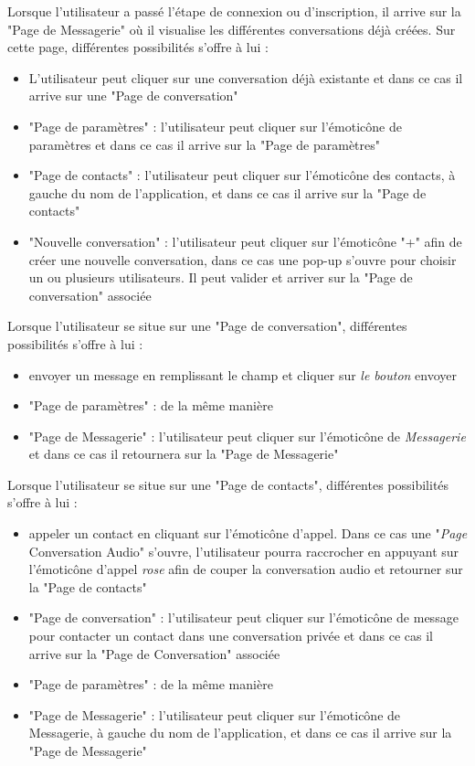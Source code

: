 	Lorsque l'utilisateur a passé l'étape de connexion ou d'inscription, il arrive sur la "Page de Messagerie" où il visualise les différentes conversations déjà créées. Sur cette page, différentes possibilités s'offre à lui :
	\begin{itemize}
		\item L'utilisateur peut cliquer sur une conversation déjà existante et dans ce cas il arrive sur une "Page de conversation"
		\item "Page de paramètres" : l'utilisateur peut cliquer sur l’émoticône de paramètres et dans ce cas il arrive sur la "Page de paramètres"
		\item "Page de contacts" : l'utilisateur peut cliquer sur l’émoticône des contacts, à gauche du nom de l'application, et dans ce cas il arrive sur la "Page de contacts"
		\item "Nouvelle conversation" : l'utilisateur peut cliquer sur l’émoticône "+" afin de créer une nouvelle conversation, dans ce cas une pop-up s'ouvre pour choisir un ou plusieurs utilisateurs. Il peut valider et arriver sur la "Page de conversation" associée\\
	\end{itemize}

	Lorsque l'utilisateur se situe sur une "Page de conversation", différentes possibilités s'offre à lui :
	\begin{itemize}
		\item envoyer un message en remplissant le champ et cliquer sur \textit{le bouton} envoyer
		\item "Page de paramètres" : de la même manière
		\item "Page de Messagerie" : l'utilisateur peut cliquer sur l’émoticône de \textit{Messagerie} et dans ce cas il retournera sur la "Page de Messagerie"\\
	\end{itemize}

	\newpage

	Lorsque l'utilisateur se situe sur une "Page de contacts", différentes possibilités s'offre à lui :
	\begin{itemize}
		\item appeler un contact en cliquant sur l’émoticône d'appel.
		Dans ce cas une "\textit{Page} Conversation Audio" s'ouvre, l'utilisateur pourra raccrocher en appuyant sur l’émoticône d'appel \textit{rose} afin de couper la conversation audio et retourner sur la "Page de contacts"
		\item "Page de conversation" : l'utilisateur peut cliquer sur l’émoticône de message pour contacter un contact dans une conversation privée et dans ce cas il arrive sur la "Page de Conversation" associée
		\item "Page de paramètres" : de la même manière
		\item "Page de Messagerie" : l'utilisateur peut cliquer sur l’émoticône de Messagerie, à gauche du nom de l'application, et dans ce cas il arrive sur la "Page de Messagerie"\\
	\end{itemize}

